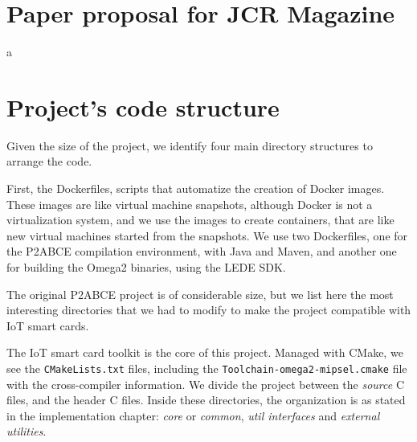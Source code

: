 \chapter{Paper proposal for JCR Magazine}\label{ch:JCR}

a


\chapter{Project's code structure}\label{ch:code}

Given the size of the project, we identify four main directory structures to arrange the code.


First, the Dockerfiles, scripts that automatize the creation of Docker images. These images are like virtual machine snapshots, although Docker is not a virtualization system, and we use the images to create containers, that are like new virtual machines started from the snapshots. We use two Dockerfiles, one for the P2ABCE compilation environment, with Java and Maven, and another one for building the Omega2 binaries, using the LEDE SDK.



\hfil

The original P2ABCE project is of considerable size, but we list here the most interesting directories that we had to modify to make the project compatible with IoT smart cards.

\hfil




\hfil

The IoT smart card toolkit is the core of this project. Managed with CMake, we see the \texttt{CMakeLists.txt} files, including the \texttt{Toolchain-omega2-mipsel.cmake} file with the cross-compiler information. We divide the project between the \textit{source} C files, and the header C files. Inside these directories, the organization is as stated in the implementation chapter: \textit{core} or \textit{common}, \textit{util interfaces} and \textit{external utilities}.

